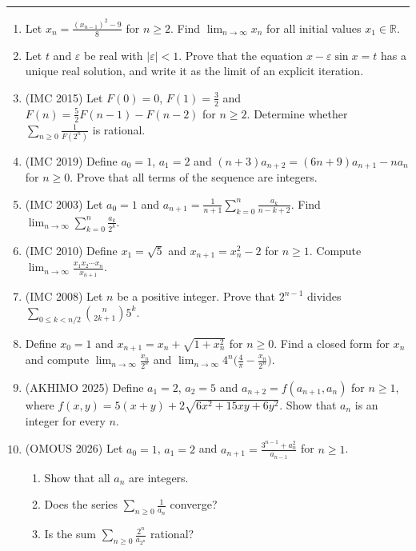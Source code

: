 \documentclass[11pt,a4paper]{article}
\renewcommand{\le}{\leqslant}
\renewcommand{\ge}{\geqslant}
\begin{document}
\noindent\rule{\textwidth}{0.4pt}\par\vspace{4pt}
\begin{enumerate}
\item Let $x_n=\frac{(x_{n-1})^2-9}8$ for $n\ge2$. Find $\lim_{n\to\infty}x_n$ for all initial
values $x_1\in\mathbb R$.

\item Let $t$ and $\varepsilon$ be real with $|\varepsilon|<1$. Prove that the equation
$x-\varepsilon\sin x=t$ has a unique real solution, and write it as the limit of an explicit
iteration.

\item (IMC 2015) Let $F(0)=0$, $F(1)=\frac32$ and $F(n)=\frac52F(n-1)-F(n-2)$ for $n\ge2$.
Determine whether $\sum_{n\ge0}\frac1{F(2^n)}$ is rational.

\item (IMC 2019) Define $a_0=1$, $a_1=2$ and $(n+3)a_{n+2}=(6n+9)a_{n+1}-na_n$ for $n\ge0$.
Prove that all terms of the sequence are integers.

\item (IMC 2003) Let $a_0=1$ and $a_{n+1}=\frac1{n+1}\sum_{k=0}^n\frac{a_k}{n-k+2}$. Find
$\lim_{n\to\infty}\sum_{k=0}^n\frac{a_k}{2^k}$.

\item (IMC 2010) Define $x_1=\sqrt5$ and $x_{n+1}=x_n^2-2$ for $n\ge1$. Compute
$\lim_{n\to\infty}\frac{x_1x_2\cdots x_n}{x_{n+1}}$.

\item (IMC 2008) Let $n$ be a positive integer. Prove that $2^{n-1}$ divides
$\sum_{0\le k<n/2}\binom n{2k+1}5^k$.

\item Define $x_0=1$ and $x_{n+1}=x_n+\sqrt{1+x_n^2}$ for $n\ge0$. Find a closed form for $x_n$
and compute $\lim_{n\to\infty}\frac{x_n}{2^n}$ and $\lim_{n\to\infty}4^n\bigl(\frac4\pi-\frac{x_n}{2^n}\bigr)$.

\item (AKHIMO 2025) Define $a_1=2$, $a_2=5$ and $a_{n+2}=f(a_{n+1},a_n)$ for $n\ge1$, where
$f(x,y)=5(x+y)+2\sqrt{6x^2+15xy+6y^2}$. Show that $a_n$ is an integer for every $n$.

\item (OMOUS 2026) Let $a_0=1$, $a_1=2$ and $a_{n+1}=\frac{3^{n-1}+a_n^2}{a_{n-1}}$ for $n\ge1$.
\begin{enumerate}[label=\alph*),leftmargin=2.64em,labelsep=0.94em]
\item Show that all $a_n$ are integers.
\item Does the series $\sum_{n\ge0}\frac1{a_n}$ converge?
\item Is the sum $\sum_{n\ge0}\frac{2^n}{a_{2^n}}$ rational?
\end{enumerate}
\end{enumerate}
\end{document}

